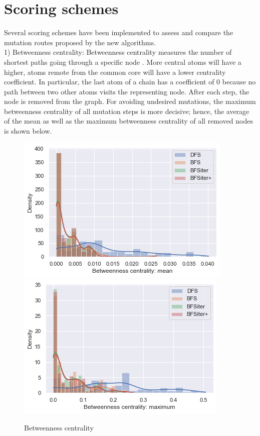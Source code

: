 \section{Scoring schemes}

Several scoring schemes have been implemented to assess and compare
the mutation routes proposed by the new algorithms.\\
1) Betweenness centrality: Betweenness centrality measures the number
of shortest paths going through a specific node \cite{Newman.2010}. More central atoms
will have a higher, atoms remote from
the common core will have a lower centrality coefficient. In particular, the last atom of a chain
has a coefficient of 0 because no path between two other atoms visits
the representing node. After each step, the node is removed from
the graph.
For avoiding undesired mutations, the maximum betweenness centrality
of all mutation steps is more decisive; hence, the average of the mean
as well as the maximum betweenness centrality of all removed nodes
is shown below.

\begin{figure}[H]
	
	\includegraphics[scale=0.8]{betweenness_mean_all}\includegraphics[scale=0.8]{betweenness_max_all}\caption{Betweenness centrality }
	
\end{figure}


